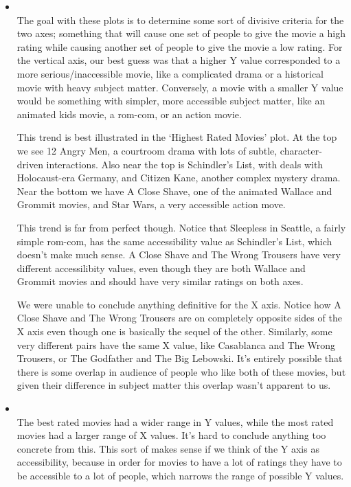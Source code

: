 \begin{itemize}

    \item {} \\
    The goal with these plots is to determine some sort of divisive criteria
    for the two axes; something that will cause one set of people to give the
    movie a high rating while causing another set of people to give the movie
    a low rating. For the vertical axis, our best guess was that a higher Y
    value corresponded to a more serious/inaccessible movie, like a complicated
    drama or a historical movie with heavy subject matter. Conversely, a movie
    with a smaller Y value would be something with simpler, more accessible
    subject matter, like an animated kids movie, a rom-com, or an action movie.

    This trend is best illustrated in the `Highest Rated Movies' plot. At the top
    we see 12 Angry Men, a courtroom drama with lots of subtle, character-driven
    interactions. Also near the top is Schindler's List, with deals with 
    Holocaust-era Germany, and Citizen Kane, another complex mystery drama.
    Near the bottom we have A Close Shave, one of the animated Wallace and Grommit
    movies, and Star Wars, a very accessible action move.

    This trend is far from perfect though. Notice that Sleepless in Seattle,
    a fairly simple rom-com, has the same accessibility value as Schindler's List,
    which doesn't make much sense. A Close Shave and The Wrong Trousers have
    very different accessilibity values, even though they are both Wallace and
    Grommit movies and should have very similar ratings on both axes.

    We were unable to conclude anything definitive for the X axis. Notice how
    A Close Shave and The Wrong Trousers are on completely opposite sides of the X
    axis even though one is basically the sequel of the other. Similarly,
    some very different pairs have the same X value, like Casablanca and The
    Wrong Trousers, or The Godfather and The Big Lebowski. It's entirely possible
    that there is some overlap in audience of people who like both of these
    movies, but given their difference in subject matter this overlap wasn't
    apparent to us. 

    \item {} \\
    The best rated movies had a wider range in Y values, while the most rated
    movies had a larger range of X values. It's hard to conclude anything too
    concrete from this. This sort of makes sense if we think of the Y axis as
    accessibility, because in order for movies to have a lot of ratings they
    have to be accessible to a lot of people, which narrows the range of possible
    Y values.


\end{itemize}
